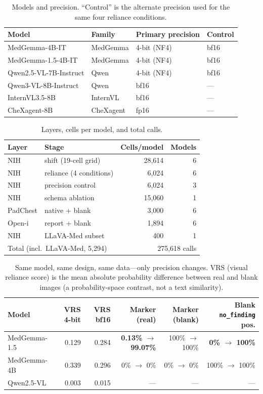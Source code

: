 \begin{table}[H]
\centering
\small
\caption{Models and precision. ``Control'' is the alternate precision used for the same four reliance conditions.}
\label{tab:models}
\begin{tabular}{llll}
\toprule
Model & Family & Primary precision & Control \\
\midrule
MedGemma-4B-IT & MedGemma & 4-bit (NF4) & bf16 \\
MedGemma-1.5-4B-IT & MedGemma & 4-bit (NF4) & bf16 \\
Qwen2.5-VL-7B-Instruct & Qwen & 4-bit (NF4) & bf16 \\
Qwen3-VL-8B-Instruct & Qwen & bf16 & --- \\
InternVL3.5-8B & InternVL & bf16 & --- \\
CheXagent-8B & CheXagent & fp16 & --- \\
\bottomrule
\end{tabular}
\end{table}

\begin{table}[H]
\centering
\small
\caption{Layers, cells per model, and total calls.}
\label{tab:calls}
\begin{tabular}{llrr}
\toprule
Layer & Stage & Cells/model & Models \\
\midrule
NIH & shift (19-cell grid) & 28,614 & 6 \\
NIH & reliance (4 conditions) & 6,024 & 6 \\
NIH & precision control & 6,024 & 3 \\
NIH & schema ablation & 15,060 & 1 \\
PadChest & native + blank & 3,000 & 6 \\
Open-i & report + blank & 1,894 & 6 \\
NIH & LLaVA-Med subset & 400 & 1 \\
\midrule
\multicolumn{2}{l}{Total (incl.\ LLaVA-Med, 5,294)} & \multicolumn{2}{r}{275,618 calls} \\
\bottomrule
\end{tabular}
\end{table}

\begin{table}[H]
\centering
\small
\caption{Same model, same design, same data---only precision changes. VRS (visual reliance score) is the mean absolute probability difference between real and blank images (a probability-space contrast, not a text similarity).}
\label{tab:precision}
\begin{tabular}{lrrrrr}
\toprule
Model & VRS 4-bit & VRS bf16 & Marker (real) & Marker (blank) & Blank \texttt{no\_finding} pos. \\
\midrule
MedGemma-1.5 & 0.129 & 0.284 & \textbf{0.13\% $\rightarrow$ 99.07\%} & 100\% $\rightarrow$ 100\% & \textbf{0\% $\rightarrow$ 100\%} \\
MedGemma-4B & 0.339 & 0.296 & 0\% $\rightarrow$ 0\% & 0\% $\rightarrow$ 0\% & 100\% $\rightarrow$ 100\% \\
Qwen2.5-VL & 0.003 & 0.015 & --- & --- & --- \\
\bottomrule
\end{tabular}
\end{table}

